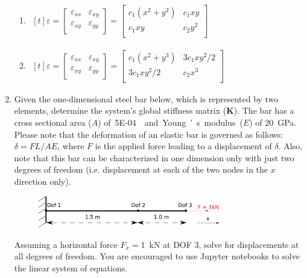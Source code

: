 \documentclass[a4paper,12pt]{article}
\begin{document}
\begin{enumerate}
	\begin{enumerate}
		\item $\!
			\begin{aligned}[t]
				\varepsilon = %
				\begin{bmatrix}
				\varepsilon_{xx} & \varepsilon_{xy} \\
				\varepsilon_{xy} & \varepsilon_{yy} \\
				\end{bmatrix} = 
				\begin{bmatrix}
				c_1(x^2 + y^2) & c_1 xy \\
				c_1 xy & c_2 y^2 \\
				\end{bmatrix}
			\end{aligned}$
		\item $\!
			\begin{aligned}[t]
				\varepsilon = %
				\begin{bmatrix}
					\varepsilon_{xx} & \varepsilon_{xy} \\
					\varepsilon_{xy} & \varepsilon_{yy} \\
				\end{bmatrix} = 
				\begin{bmatrix}
				c_1(x^2 + y^3) & 3c_1 xy^2/2 \\
				3c_1 xy^2/2 & c_2 x^3 \\
				\end{bmatrix}
			\end{aligned}$		
	\end{enumerate}
	
	\item Given the one-dimensional steel bar below, which is represented by two elements, 
	determine the system's global stiffness matrix ($\mathbf{K}$).  The bar has a cross sectional area 
	($A$) of~\SI{5E-04}{\meter\square} and Young’s modulus ($E$) of \SI{20}{\giga\pascal}. Please note that the deformation of an elastic bar is governed as follows:  $\delta = FL/AE$, where $F$ is the 
	applied force leading to a displacement of $\delta$.  Also, note that this bar can be characterized in one dimension only with just two degrees of freedom (i.e. displacement at each of the two nodes in the $x$ direction only).
	
	\begin{figure}[!h]
		\centering
		\includegraphics[width=0.75\textwidth]{figs/cantilever.pdf}
	\end{figure}
	
	Assuming a horizontal force $F_x = $\SI{1}{\kilo\newton} at DOF 3, solve for displacements at all degrees of freedom. You are encouraged to use Jupyter notebooks to solve the linear system of equations.
\end{enumerate}
\end{document}
